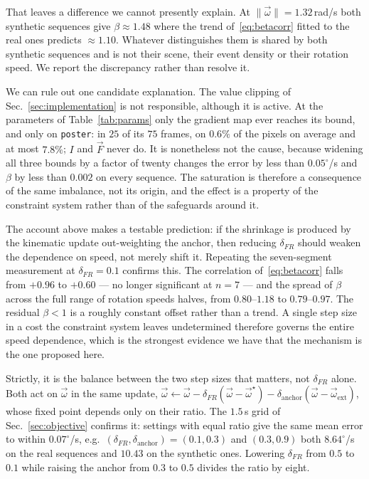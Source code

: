 \documentclass[journal]{IEEEtran}
\newcommand{\Imap}{I}
\newcommand{\Fmap}{\vec{F}}
\newcommand{\wvec}{\vec{\omega}}
\begin{document}
That leaves a difference we cannot presently explain. At
$\|\wvec\| = 1.32$\,rad/s both synthetic sequences give $\beta \approx 1.48$
where the trend of~\eqref{eq:betacorr} fitted to the real ones predicts
$\approx 1.10$. Whatever distinguishes them is shared by both synthetic
sequences and is not their scene, their event density or their rotation speed.
We report the discrepancy rather than resolve it.

We can rule out one candidate explanation. The value clipping of
Sec.~\ref{sec:implementation} is not responsible, although it is active. At the
parameters of Table~\ref{tab:params} only the gradient map ever reaches its
bound, and only on \texttt{poster}: in $25$ of its $75$ frames, on $0.6\%$ of
the pixels on average and at most $7.8\%$; $\Imap$ and $\Fmap$ never do. It is
nonetheless not the cause, because widening all three bounds by a factor of
twenty changes the error by less than $0.05^\circ$/s and $\beta$ by less than
$0.002$ on every sequence. The saturation is
therefore a consequence of the same imbalance, not its origin, and the effect is
a property of the constraint system rather than of the safeguards around it.

The account above makes a testable prediction: if the shrinkage is produced by
the kinematic update out-weighting the anchor, then reducing $\delta_{F\!R}$
should weaken the dependence on speed, not merely shift it. Repeating the
seven-segment measurement at $\delta_{F\!R} = 0.1$ confirms this. The
correlation of~\eqref{eq:betacorr} falls from $+0.96$ to $+0.60$ --- no longer
significant at $n = 7$ --- and the spread of $\beta$ across the full range of
rotation speeds halves, from $0.80$--$1.18$ to $0.79$--$0.97$. The residual
$\beta < 1$ is a roughly constant offset rather than a trend. A single step size
in a cost the constraint system leaves undetermined therefore governs the entire
speed dependence, which is the strongest evidence we have that the mechanism is
the one proposed here.

Strictly, it is the balance between the two step sizes that matters, not
$\delta_{F\!R}$ alone. Both act on $\wvec$ in the same update,
$\wvec \leftarrow \wvec - \delta_{F\!R}(\wvec-\wvec^\star)
 - \delta_{\text{anchor}}(\wvec-\wvec_{\text{ext}})$, whose fixed point depends
only on their ratio. The $1.5$\,s grid of Sec.~\ref{sec:objective} confirms it:
settings with equal ratio give the same mean error to within $0.07^\circ$/s,
e.g.\ $(\delta_{F\!R}, \delta_{\text{anchor}}) = (0.1, 0.3)$ and $(0.3, 0.9)$
both $8.64^\circ$/s on the real sequences and $10.43$ on the synthetic ones.
Lowering $\delta_{F\!R}$ from $0.5$ to $0.1$ while raising the anchor from
$0.3$ to $0.5$ divides the ratio by eight.
\end{document}
